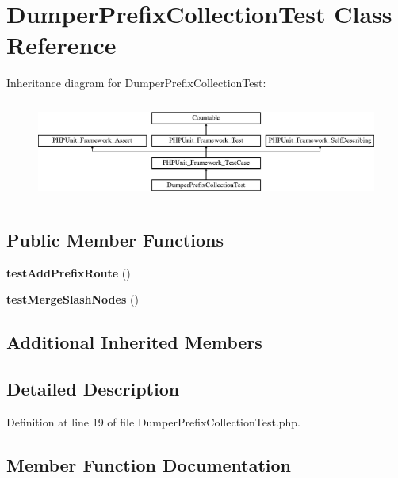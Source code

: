 \section{Dumper\+Prefix\+Collection\+Test Class Reference}
\label{class_symfony_1_1_component_1_1_routing_1_1_tests_1_1_matcher_1_1_dumper_1_1_dumper_prefix_collection_test}
Inheritance diagram for Dumper\+Prefix\+Collection\+Test\+:\begin{figure}[H]
\begin{center}
\leavevmode
\includegraphics[height=3.303835cm]{class_symfony_1_1_component_1_1_routing_1_1_tests_1_1_matcher_1_1_dumper_1_1_dumper_prefix_collection_test}
\end{center}
\end{figure}
\subsection*{Public Member Functions}
\begin{DoxyCompactItemize}
\item 
{\bf test\+Add\+Prefix\+Route} ()
\item 
{\bf test\+Merge\+Slash\+Nodes} ()
\end{DoxyCompactItemize}
\subsection*{Additional Inherited Members}


\subsection{Detailed Description}


Definition at line 19 of file Dumper\+Prefix\+Collection\+Test.\+php.



\subsection{Member Function Documentation}
